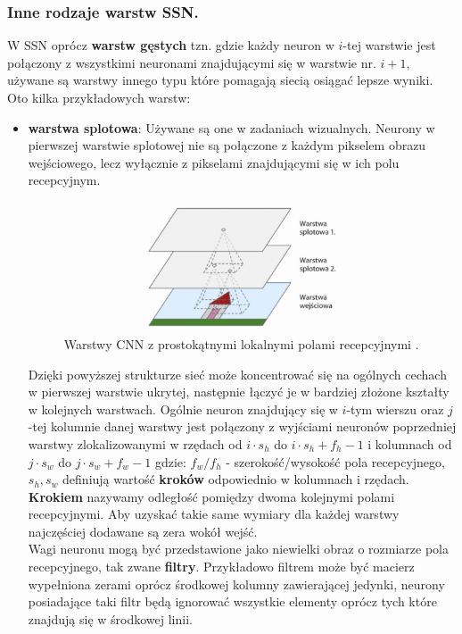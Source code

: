 \documentclass{article}
\begin{document}
\subsubsection{Inne rodzaje warstw SSN.}
W SSN oprócz \textbf{warstw gęstych} tzn.
gdzie każdy neuron w $i$-tej warstwie jest połączony z wszystkimi neuronami
znajdującymi się w warstwie nr. $i+1$,
używane są warstwy innego typu które pomagają siecią
osiągać lepsze wyniki. Oto kilka przykładowych warstw:
\begin{itemize}
\item \textbf{warstwa splotowa}:
Używane są one w zadaniach wizualnych. Neurony w pierwszej warstwie splotowej nie są
połączone z każdym pikselem obrazu wejściowego, lecz wyłącznie z pikselami
znajdującymi się w ich polu recepcyjnym.

\begin{figure}[H]
\centering
\includegraphics[scale=0.6]{cnn.png}
\caption{Warstwy CNN z prostokątnymi lokalnymi polami recepcyjnymi \cite{um}.}
\end{figure}

Dzięki powyższej strukturze sieć może koncentrować się na ogólnych cechach w pierwszej warstwie
ukrytej, następnie łączyć je w bardziej złożone kształty w kolejnych warstwach. Ogólnie neuron
znajdujący się w $i$-tym wierszu oraz $j$-tej kolumnie danej warstwy jest połączony z wyjściami 
neuronów poprzedniej warstwy zlokalizowanymi w rzędach od $i \cdot s_h$ do 
$i \cdot s_h + f_h-1$  i kolumnach
od $j \cdot s_w $ do $j \cdot s_w + f_w-1$
gdzie: $f_w/f_h$ - szerokość/wysokość pola recepcyjnego, $s_h, s_w$ definiują wartość 
\textbf{kroków} odpowiednio w kolumnach i rzędach. \textbf{Krokiem} nazywamy odległość
pomiędzy dwoma kolejnymi polami recepcyjnymi. Aby uzyskać takie same wymiary 
dla każdej warstwy najczęściej dodawane są zera wokół wejść.\\

Wagi neuronu mogą być przedstawione jako niewielki obraz o rozmiarze pola recepcyjnego, tak 
zwane \textbf{filtry}. Przykładowo filtrem może być macierz wypełniona zerami oprócz środkowej
kolumny zawierającej jedynki, neurony posiadające taki filtr będą ignorować wszystkie elementy
oprócz tych które znajdują się w środkowej linii.


\end{itemize}
\end{document}
